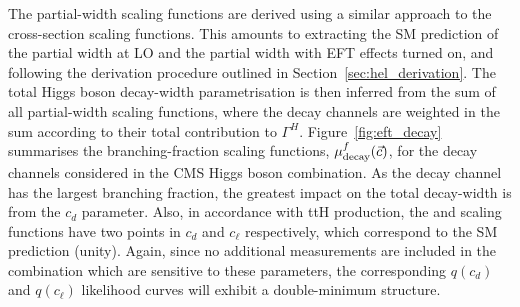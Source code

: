 
The partial-width scaling functions are derived using a similar approach to the cross-section scaling functions. This amounts to extracting the SM prediction of the partial width at LO and the partial width with EFT effects turned on, and following the derivation procedure outlined in Section~\ref{sec:hel_derivation}. The total Higgs boson decay-width parametrisation is then inferred from the sum of all partial-width scaling functions, where the decay channels are weighted in the sum according to their total contribution to $\Gamma^{H}$. Figure~\ref{fig:eft_decay} summarises the branching-fraction scaling functions, $\mu_{\rm{decay}}^f(\vec{c})$, for the decay channels considered in the CMS Higgs boson combination. As the \Hbb decay channel has the largest branching fraction, the greatest impact on the total decay-width is from the $c_d$ parameter. Also, in accordance with ttH production, the \Hbb and \Htautau scaling functions have two points in $c_d$ and $c_\ell$ respectively, which correspond to the SM prediction (unity). Again, since no additional measurements are included in the combination which are sensitive to these parameters, the corresponding $q(c_d)$ and $q(c_\ell)$ likelihood curves will exhibit a double-minimum structure.


